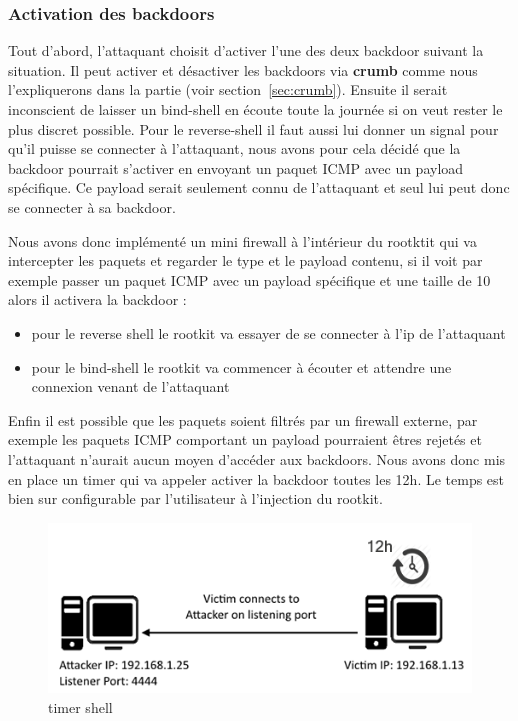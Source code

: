\documentclass[12pt]{article}
\begin{document}
        \subsubsection{Activation des backdoors}
            
Tout d'abord, l'attaquant choisit d'activer l'une des deux backdoor suivant la situation. Il peut activer et désactiver les backdoors via \textbf{crumb} comme nous l'expliquerons dans la partie (voir section~\ref{sec:crumb}). 
Ensuite il serait inconscient de laisser un bind-shell en écoute toute la journée si on veut rester le plus discret possible. Pour le reverse-shell il faut aussi lui donner un signal pour qu'il puisse se connecter à l'attaquant, nous avons pour cela décidé que la backdoor pourrait s'activer en envoyant un paquet ICMP avec un payload spécifique. Ce payload serait seulement connu de l'attaquant et seul lui peut donc se connecter à sa backdoor.

Nous avons donc implémenté un mini firewall à l'intérieur du rootktit qui va intercepter les paquets et regarder le type et le payload contenu, si il voit par exemple passer un paquet ICMP avec un payload spécifique et une taille de 10 alors il activera la backdoor :
\begin{itemize}
 \item pour le reverse shell le rootkit va essayer de se connecter à l'ip de l'attaquant
 \item pour le bind-shell le rootkit va commencer à écouter et attendre une connexion venant de l'attaquant
\end{itemize}

    Enfin il est possible que les paquets soient filtrés par un firewall externe, par exemple les paquets ICMP comportant un payload pourraient êtres rejetés et l'attaquant n'aurait aucun moyen d'accéder aux backdoors. Nous avons donc mis en place un timer qui va appeler activer la backdoor toutes les 12h. Le temps est bien sur configurable par l'utilisateur à l'injection du rootkit.
        
\begin{figure}[H] 
\begin{center}
\includegraphics{./img/timer-shell.png}

\caption[dsfsdf]{timer shell}
\end{center}
\end{figure}
                    
\end{document}
